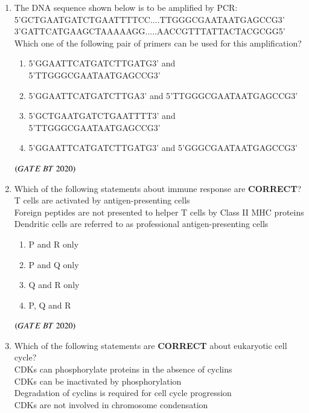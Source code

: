 \documentclass[journal,12pt,onecolumn]{IEEEtran}
\theoremstyle{remark}
\begin{document}
\begin{enumerate}[label=Q\arabic*:]
\begin{enumerate}[label=Q\arabic*:, start=26, leftmargin=2em]
\item The DNA sequence shown below is to be amplified by PCR:\\
5'GCTGAATGATCTGAATTTTCC....TTGGGCGAATAATGAGCCG3'\\
3'GATTCATGAAGCTAAAAAGG.....AACCGTTTATTACTACGCGG5'\\
Which one of the following pair of primers can be used for this amplification?
\begin{enumerate}[label=\alph*)]
\item 5'GGAATTCATGATCTTGATG3' and 5'TTGGGCGAATAATGAGCCG3'
\item 5'GGAATTCATGATCTTGA3' and 5'TTGGGCGAATAATGAGCCG3'
\item 5'GCTGAATGATCTGAATTTT3' and 5'TTGGGCGAATAATGAGCCG3'
\item 5'GGAATTCATGATCTTGATG3' and 5'GGGCGAATAATGAGCCG3'
\end{enumerate}
\hfill$\left(GATE\ BT\ 2020\right)$


\item Which of the following statements about immune response are \textbf{CORRECT}?\\
 T cells are activated by antigen-presenting cells\\
 Foreign peptides are not presented to helper T cells by Class II MHC proteins\\
 Dendritic cells are referred to as professional antigen-presenting cells
\begin{multicols}{2}
\begin{enumerate}[label=\alph*)]
\item P and R only
\item P and Q only
\item Q and R only
\item P, Q and R
\end{enumerate}
\end{multicols}
\hfill$\left(GATE\ BT\ 2020\right)$

\item Which of the following statements are \textbf{CORRECT} about eukaryotic cell cycle?\\
 CDKs can phosphorylate proteins in the absence of cyclins\\
 CDKs can be inactivated by phosphorylation\\
Degradation of cyclins is required for cell cycle progression\\
CDKs are not involved in chromosome condensation


\end{enumerate}
\end{enumerate}
\end{document}
